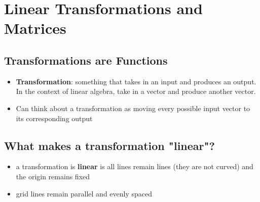 \section{Linear Transformations and Matrices}
\subsection{Transformations are Functions}
\begin{itemize}
    \item \textbf{Transformation}: something that takes in an input and produces an output. In the context of linear algebra, take in a vector and produce another vector.
    \item Can think about a transformation as moving every possible input vector to its corresponding output
\end{itemize}

\subsection{What makes a transformation "linear"?}
\begin{itemize}
    \item a transformation is \textbf{linear} is all lines remain lines (they are not curved) and the origin remains fixed
    \item grid lines remain parallel and evenly spaced
\end{itemize}

